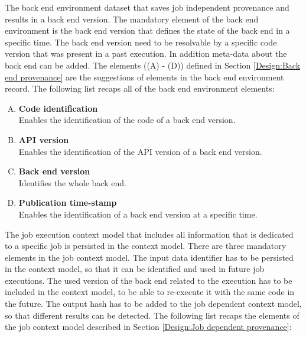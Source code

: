 \documentclass[draft,final]{vutinfth} %
\begin{document}
The back end environment dataset that saves job independent provenance and results in a back end version. The mandatory element of the back end environment is the back end version that defines the state of the back end in a specific time. The back end version need to be resolvable by a specific code version that was present in a past execution. In addition meta-data about the back end can be added. The elements ((A) - (D)) defined in Section \ref{Design:Back end provenance} are the suggestions of elements in the back end environment record. The following list recaps all of the back end environment elements: 

\begin{enumerate}[(A)]
	\item \textbf{Code identification} \\
	Enables the identification of the code of a back end version.
	\item \textbf{API version} \\
	Enables the identification of the API version of a back end version.
	\item \textbf{Back end version} \\ 
	Identifies the whole back end.
	\item \textbf{Publication time-stamp} \\ 
	Enables the identification of a back end version at a specific time.
\end{enumerate}

The job execution context model that includes all information that is dedicated to a specific job is persisted in the context model. There are three mandatory elements in the job context model. The input data identifier has to be persisted in the context model, so that it can be identified and used in future job executions. The used version of the back end related to the execution has to be included in the context model, to be able to re-execute it with the same code in the future. The output hash has to be added to the job dependent context model, so that different results can be detected. The following list recaps the elements of the job context model described in Section \ref{Design:Job dependent provenance}: 
\end{document}
